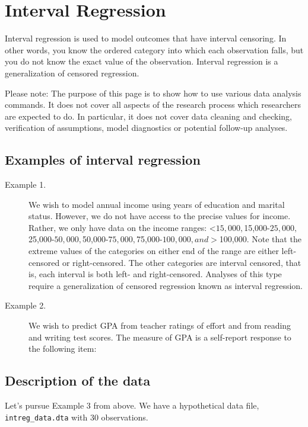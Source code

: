 \documentclass[a4paper,12pt]{article}
\begin{document}
	\Large

\section{Interval Regression}

Interval regression is used to model outcomes that have interval censoring.  In other words, you know the ordered category into which each observation falls, but you do not know the exact value of the observation.  Interval regression is a generalization of censored regression.

Please note: The purpose of this page is to show how to use various data analysis commands.  It does not cover all aspects of the research process which researchers are expected to do.  In particular, it does not cover data cleaning and checking, verification of assumptions, model diagnostics or potential follow-up analyses.

\subsection*{Examples of interval regression}

\begin{description}
\item[Example 1.]  We wish to model annual income using years of education and marital status.  However, we do not have access to the precise values for income.  Rather, we only have data on the income ranges: <$15,000, $15,000-$25,000, $25,000-$50,000, $50,000-$75,000, $75,000-$100,000, and >$100,000.  Note that the extreme values of the categories on either end of the range are either left-censored or right-censored.  The other categories are interval censored, that is, each interval is both left- and right-censored.  Analyses of this type require a generalization of censored regression known as interval regression.

\item[Example 2.]  We wish to predict GPA from teacher ratings of effort and from reading and writing test scores.  The measure of GPA is a self-report response to the following item:
\end{description}

\subsection*{Description of the data}
Let's pursue Example 3 from above. We have a hypothetical data file, \texttt{intreg\_data.dta} with 30 observations.
\end{document}
